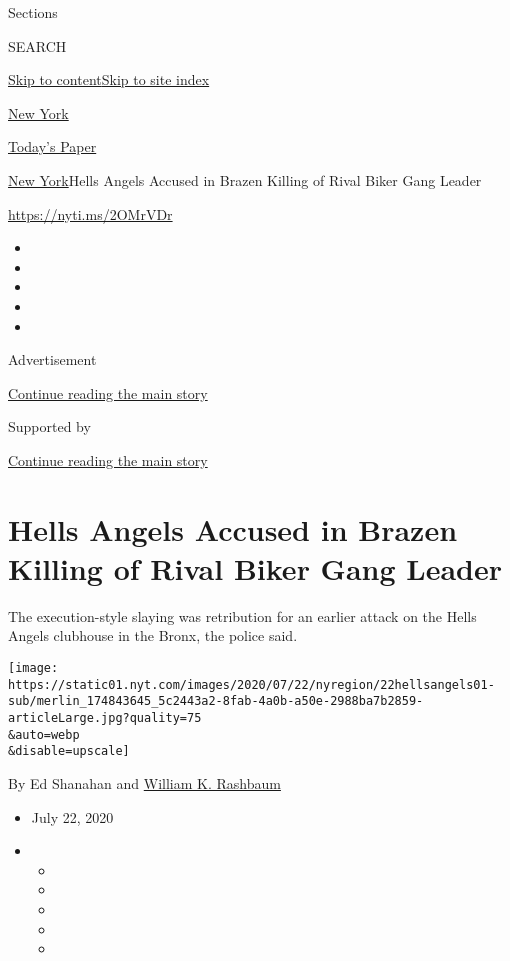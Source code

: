 Sections

SEARCH

\protect\hyperlink{site-content}{Skip to
content}\protect\hyperlink{site-index}{Skip to site index}

\href{https://www.nytimes.com/section/nyregion}{New York}

\href{https://myaccount.nytimes.com/auth/login?response_type=cookie\&client_id=vi}{}

\href{https://www.nytimes.com/section/todayspaper}{Today's Paper}

\href{/section/nyregion}{New York}\textbar{}Hells Angels Accused in
Brazen Killing of Rival Biker Gang Leader

\url{https://nyti.ms/2OMrVDr}

\begin{itemize}
\item
\item
\item
\item
\item
\end{itemize}

Advertisement

\protect\hyperlink{after-top}{Continue reading the main story}

Supported by

\protect\hyperlink{after-sponsor}{Continue reading the main story}

\hypertarget{hells-angels-accused-in-brazen-killing-of-rival-biker-gang-leader}{%
\section{Hells Angels Accused in Brazen Killing of Rival Biker Gang
Leader}\label{hells-angels-accused-in-brazen-killing-of-rival-biker-gang-leader}}

The execution-style slaying was retribution for an earlier attack on the
Hells Angels clubhouse in the Bronx, the police said.

\texttt{[image: https://static01.nyt.com/images/2020/07/22/nyregion/22hellsangels01-sub/merlin\_174843645\_5c2443a2-8fab-4a0b-a50e-2988ba7b2859-articleLarge.jpg?quality=75\\\&auto=webp\\\&disable=upscale]}

By Ed Shanahan and
\href{https://www.nytimes.com/by/william-k-rashbaum}{William K.
Rashbaum}

\begin{itemize}
\item
  July 22, 2020
\item
  \begin{itemize}
  \item
  \item
  \item
  \item
  \item
  \end{itemize}
\end{itemize}


